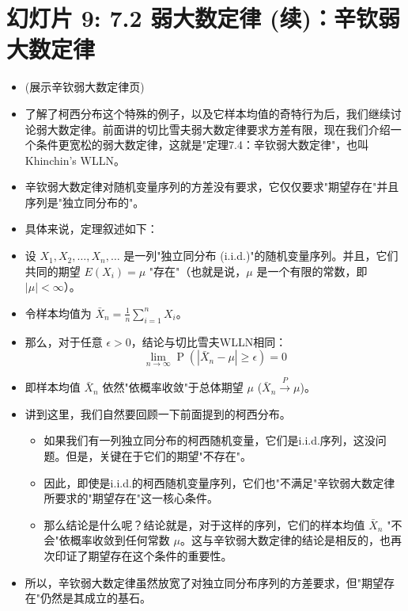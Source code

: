 \documentclass[UTF8]{article} %
\DeclareMathOperator{\Prob}{\operatorname{P}}
\begin{document}
\section*{幻灯片 9: 7.2 弱大数定律 (续)：辛钦弱大数定律}
\begin{itemize}
    \itemsep1em
    \item (展示辛钦弱大数定律页)
    \item 了解了柯西分布这个特殊的例子，以及它样本均值的奇特行为后，我们继续讨论弱大数定律。前面讲的切比雪夫弱大数定律要求方差有限，现在我们介绍一个条件更宽松的弱大数定律，这就是"定理7.4：辛钦弱大数定律"，也叫Khinchin's WLLN。
    \item 辛钦弱大数定律对随机变量序列的方差没有要求，它仅仅要求"期望存在"并且序列是"独立同分布的"。
    \item 具体来说，定理叙述如下：
    \item 设 $X_1, X_2, \dots, X_n, \dots$ 是一列"独立同分布 (i.i.d.)"的随机变量序列。并且，它们共同的期望 $E(X_i) = \mu$ "存在"（也就是说，$\mu$ 是一个有限的常数，即 $|\mu| < \infty$）。
    \item 令样本均值为 $\bar{X}_n = \frac{1}{n} \sum_{i=1}^{n} X_i$。
    \item 那么，对于任意 $\epsilon > 0$，结论与切比雪夫WLLN相同：
    \[ \lim_{n \to \infty} \Prob(|\bar{X}_n - \mu| \geq \epsilon) = 0 \]
    \item 即样本均值 $\bar{X}_n$ 依然"依概率收敛"于总体期望 $\mu$ ($\bar{X}_n \xrightarrow{P} \mu$)。
    \item 讲到这里，我们自然要回顾一下前面提到的柯西分布。
    \begin{itemize}[label=\textbullet, itemsep=0.3em]
        \item 如果我们有一列独立同分布的柯西随机变量，它们是i.i.d.序列，这没问题。但是，关键在于它们的期望"不存在"。
        \item 因此，即使是i.i.d.的柯西随机变量序列，它们也"不满足"辛钦弱大数定律所要求的"期望存在"这一核心条件。
        \item 那么结论是什么呢？结论就是，对于这样的序列，它们的样本均值 $\bar{X}_n$ "不会"依概率收敛到任何常数 $\mu$。这与辛钦弱大数定律的结论是相反的，也再次印证了期望存在这个条件的重要性。
    \end{itemize}
    \item 所以，辛钦弱大数定律虽然放宽了对独立同分布序列的方差要求，但"期望存在"仍然是其成立的基石。
\end{itemize}
\end{document}
